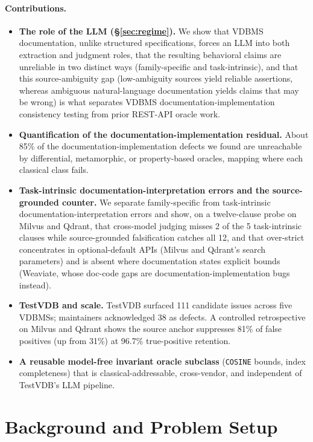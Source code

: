 \documentclass[sigconf]{acmart}
\begin{document}
\paragraph{Contributions.}
\begin{itemize}
  \item \textbf{The role of the LLM (\S\ref{sec:regime}).} We show that VDBMS documentation, unlike structured specifications, forces an LLM into both extraction and judgment roles, that the resulting behavioral claims are unreliable in two distinct ways (family-specific and task-intrinsic), and that this source-ambiguity gap (low-ambiguity sources yield reliable assertions, whereas ambiguous natural-language documentation yields claims that may be wrong) is what separates VDBMS documentation-implementation consistency testing from prior REST-API oracle work.
  \item \textbf{Quantification of the documentation-implementation residual.} About 85\% of the documentation-implementation defects we found are unreachable by differential, metamorphic, or property-based oracles, mapping where each classical class fails.
  \item \textbf{Task-intrinsic documentation-interpretation errors and the source-grounded counter.} We separate family-specific from task-intrinsic documentation-interpretation errors and show, on a twelve-clause probe on Milvus and Qdrant, that cross-model judging misses 2 of the 5 task-intrinsic clauses while source-grounded falsification catches all 12, and that over-strict concentrates in optional-default APIs (Milvus and Qdrant's search parameters) and is absent where documentation states explicit bounds (Weaviate, whose doc-code gaps are documentation-implementation bugs instead).
  \item \textbf{TestVDB and scale.} TestVDB surfaced 111 candidate issues across five VDBMSs; maintainers acknowledged 38 as defects. A controlled retrospective on Milvus and Qdrant shows the source anchor suppresses 81\% of false positives (up from 31\%) at 96.7\% true-positive retention.
  \item \textbf{A reusable model-free invariant oracle subclass} (\texttt{COSINE} bounds, index completeness) that is classical-addressable, cross-vendor, and independent of TestVDB's LLM pipeline.
\end{itemize}

\section{Background and Problem Setup}
\end{document}
